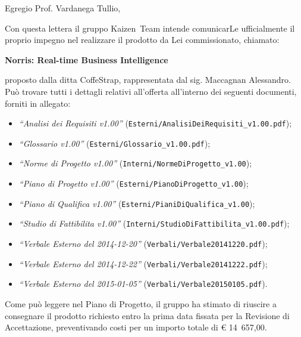 \documentclass{letter}
\begin{document}
\begin{letter}{}

	\vspace{1cm}
	
	\opening{Egregio Prof. Vardanega Tullio,}
	
	Con questa lettera il gruppo Kaizen~Team intende comunicarLe ufficialmente il proprio impegno nel realizzare il prodotto da Lei commissionato, chiamato:
	\begin{center}
		\textbf{Norris: Real-time Business Intelligence}
	\end{center}
	proposto dalla ditta CoffeStrap, rappresentata dal sig. Maccagnan Alessandro.\\
	Può trovare tutti i dettagli relativi all'offerta all'interno dei seguenti documenti, forniti in allegato:

	\begin{itemize}	
	\item \textit{“Analisi dei Requisiti v1.00”} (\texttt{Esterni/AnalisiDeiRequisiti\_v1.00.pdf});
	\item \textit{“Glossario v1.00”} (\texttt{Esterni/Glossario\_v1.00.pdf});
	\item \textit{“Norme di Progetto v1.00”} (\texttt{Interni/NormeDiProgetto\_v1.00});
	\item \textit{“Piano di Progetto v1.00”} (\texttt{Esterni/PianoDiProgetto\_v1.00});
	\item \textit{“Piano di Qualifica v1.00”} (\texttt{Esterni/PianiDiQualifica\_v1.00});
	\item \textit{“Studio di Fattibilita v1.00”} (\texttt{Interni/StudioDiFattibilita\_v1.00.pdf});
	\item \textit{“Verbale Esterno del 2014-12-20”} (\texttt{Verbali/Verbale20141220.pdf});
	\item \textit{“Verbale Esterno del 2014-12-22”} (\texttt{Verbali/Verbale20141222.pdf});
	\item \textit{“Verbale Esterno del 2015-01-05”} (\texttt{Verbali/Verbale20150105.pdf}).
	\end{itemize}
	Come può leggere nel Piano di Progetto, il gruppo ha stimato di riuscire a consegnare il prodotto richiesto entro la prima data fissata per la Revisione di Accettazione, preventivando costi per un importo totale di \euro{} 14~657,00.

	\newpage


\end{letter}
\end{document}

